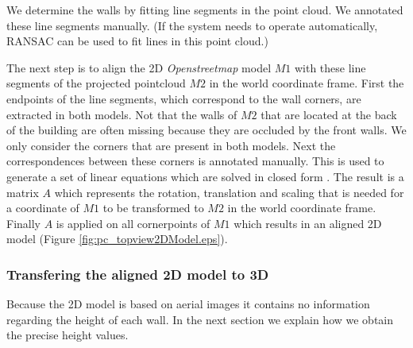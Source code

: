 We determine the walls by fitting line segments in the point cloud.  We
annotated these line segments manually.  (If the system needs to operate
automatically, RANSAC can be used to fit lines in this point cloud.)

\clearpage

The next step is to align the 2D \emph{Openstreetmap\cite{Openstreetmap}} model $M1$ with these line segments of the
projected pointcloud $M2$ in the world coordinate frame.  First the endpoints of the line segments, which
correspond to the wall corners, are extracted in both models.
Not that the walls of $M2$ that are located at the back of the building are often missing
because they are occluded by the front walls. We only consider the corners that
are present in both models.
Next the correspondences between these corners is annotated manually. 
This is used to generate a set of linear equations
which are solved in closed form \cite{hartley}. The result is a matrix $A$
which represents the rotation, translation and scaling that is needed for a
coordinate of $M1$ to be transformed to $M2$ in the world coordinate frame.
Finally $A$ is applied on all cornerpoints of $M1$ which results in an aligned 2D
model (Figure \ref{fig:pc_topview2DModel.eps}).








\subsubsection{Transfering the aligned 2D model to 3D}
Because the 2D model is based on aerial images it contains no
information regarding the height of each wall. 
In the next section we explain how we obtain the precise height values.\\

